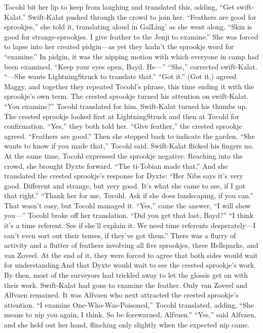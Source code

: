 \documentclass[9pt]{article}
\begin{document}
Tocohl bit her lip to keep from laughing and translated this, adding, “Get swift-Kalat.” Swift-Kalat
pushed through the crowd to join her.
“Feathers are good for sprookjes,” she told it, translating aloud in GalLing’ as she went along. “Skin
is good for strange-sprookjes. I give feather to the Jenji to examine.” She was forced to lapse into her
created pidgin—as yet they hadn’t the sprookje word for “examine.” In pidgin, it was the nipping motion
with which everyone in camp had been examined.
“Keep your eyes open, Bayd. He—”
“She,” corrected swift-Kalat.
“—She wants LightningStruck to translate that.”
“Got it.”
(Got it,) agreed Maggy, and together they repeated Tocohl’s phrase, this time ending it with the
sprookje’s own term.
The crested sprookje turned his attention on swift-Kalat. “You examine?” Tocohl translated for him.
Swift-Kalat turned his thumbs up. The crested sprookje looked first at LightningStruck and then at
Tocohl for confirmation. “Yes,” they both told her.
“Give feather,” the crested sprookje agreed. “Feathers are good.” Then she stepped back to indicate
the garden.
“She wants to know if you made that,” Tocohl said.
Swift-Kalat flicked his fingers no. At the same time, Tocohl expressed the sprookje negative.
Reaching into the crowd, she brought Dyxte forward. “The ti-Tobian made that.” And she translated the
crested sprookje’s response for Dyxte: “Her Nibs says it’s very good. Different and strange, but very
good. It’s what she came to see, if I got that right.”
“Thank her for me, Tocohl. Ask if she does landscaping, if you can.” That wasn’t easy, but Tocohl
managed it.
“Yes,” came the answer, “I will show you—” Tocohl broke off her translation. “Did you get that last,
Bayd?”
“I think it’s a time referent. See if she’ll explain it. We need time referents desperately—I can’t even
sort out their tenses, if they’ve got them.”
There was a flurry of activity and a flutter of feathers involving all five sprookjes, three Hellsparks,
and van Zoveel. At the end of it, they were forced to agree that both sides would wait for understanding.And that Dyxte would wait to see the crested sprookje’s work.
By then, most of the surveyors had trickled away to let the glossis get on with their work. Swift-Kalat
had gone to examine the feather. Only van Zoveel and Alfvaen remained. It was Alfvaen who next
attracted the crested sprookje’s attention. “I examine One-Who-Was-Poisoned,” Tocohl translated,
adding, “She means to nip you again, I think. So be forewarned, Alfvaen.”
“Yes,” said Alfvaen, and she held out her hand, flinching only slightly when the expected nip came.
\end{document}
